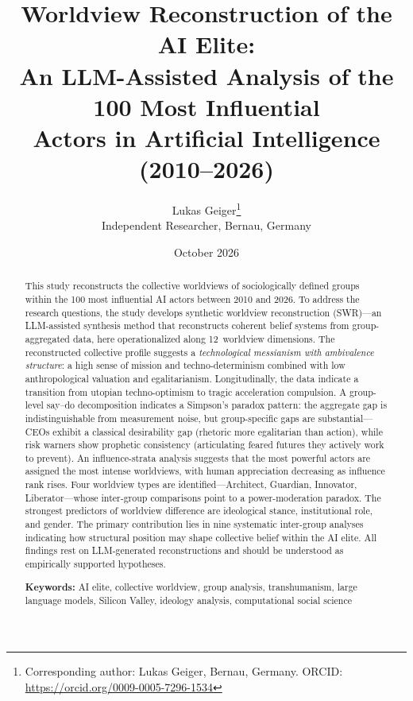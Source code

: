\documentclass[12pt,a4paper]{article}
\title{%
  \sffamily\bfseries
  Worldview Reconstruction of the AI Elite:\\[0.3em]
  \large An LLM-Assisted Analysis of the 100 Most Influential\\
  Actors in Artificial Intelligence (2010--2026)%
}
\author{%
  Lukas Geiger\thanks{Corresponding author: Lukas Geiger, Bernau, Germany. ORCID: \url{https://orcid.org/0009-0005-7296-1534}}\\[0.3em]
  \small Independent Researcher, Bernau, Germany
}
\date{October 2026}
\begin{document}


\maketitle
\thispagestyle{empty}

\begin{abstract}
\noindent
This study reconstructs the collective worldviews of sociologically defined groups within the 100 most influential AI actors between 2010 and 2026. To address the research questions, the study develops synthetic worldview reconstruction (SWR)---an LLM-assisted synthesis method that reconstructs coherent belief systems from group-aggregated data, here operationalized along 12~worldview dimensions. The reconstructed collective profile suggests a \emph{technological messianism with ambivalence structure}: a high sense of mission and techno-determinism combined with low anthropological valuation and egalitarianism. Longitudinally, the data indicate a transition from utopian techno-optimism to tragic acceleration compulsion. A group-level say--do decomposition indicates a Simpson's paradox pattern: the aggregate gap is indistinguishable from measurement noise, but group-specific gaps are substantial---CEOs exhibit a classical desirability gap (rhetoric more egalitarian than action), while risk warners show prophetic consistency (articulating feared futures they actively work to prevent). An influence-strata analysis suggests that the most powerful actors are assigned the most intense worldviews, with human appreciation decreasing as influence rank rises. Four worldview types are identified---Architect, Guardian, Innovator, Liberator---whose inter-group comparisons point to a power-moderation paradox. The strongest predictors of worldview difference are ideological stance, institutional role, and gender. The primary contribution lies in nine systematic inter-group analyses indicating how structural position may shape collective belief within the AI elite. All findings rest on LLM-generated reconstructions and should be understood as empirically supported hypotheses.

\medskip
\noindent\textbf{Keywords:} AI elite, collective worldview, group analysis, transhumanism, large language models, Silicon Valley, ideology analysis, computational social science
\end{abstract}
\end{document}
